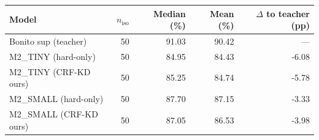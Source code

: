 \begin{tabular}{lrrrr}
\toprule
Model & $n_\text{iso}$ & Median (\%) & Mean (\%) & $\Delta$ to teacher (pp) \\
\midrule
Bonito sup (teacher) & 50 & 91.03 & 90.42 & --- \\
M2_TINY  (hard-only) & 50 & 84.95 & 84.43 & -6.08 \\
M2_TINY  (CRF-KD ours) & 50 & 85.25 & 84.74 & -5.78 \\
M2_SMALL (hard-only) & 50 & 87.70 & 87.15 & -3.33 \\
M2_SMALL (CRF-KD ours) & 50 & 87.05 & 86.53 & -3.98 \\
\bottomrule
\end{tabular}
